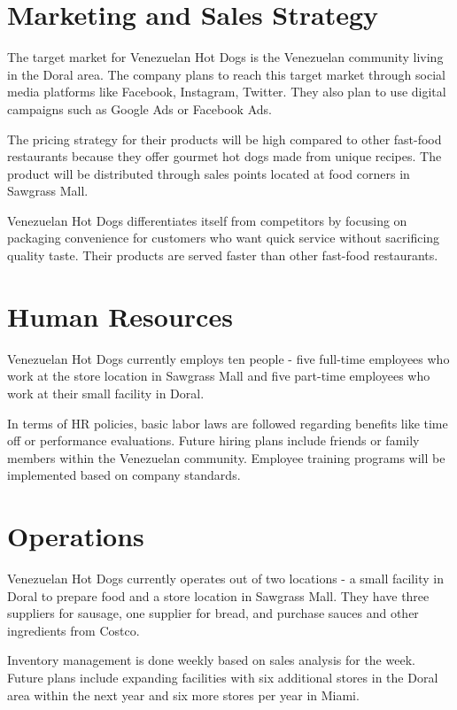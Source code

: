 \section{Marketing and Sales Strategy}\label{sec:marketing}

The target market for Venezuelan Hot Dogs is the Venezuelan community living in the Doral area. The company plans to reach this target market through social media platforms like Facebook, Instagram, Twitter. They also plan to use digital campaigns such as Google Ads or Facebook Ads.

The pricing strategy for their products will be high compared to other fast-food restaurants because they offer gourmet hot dogs made from unique recipes. The product will be distributed through sales points located at food corners in Sawgrass Mall.

Venezuelan Hot Dogs differentiates itself from competitors by focusing on packaging convenience for customers who want quick service without sacrificing quality taste. Their products are served faster than other fast-food restaurants.

\section{Human Resources}\label{sec:hr}

Venezuelan Hot Dogs currently employs ten people - five full-time employees who work at the store location in Sawgrass Mall and five part-time employees who work at their small facility in Doral.
 
In terms of HR policies, basic labor laws are followed regarding benefits like time off or performance evaluations. Future hiring plans include friends or family members within the Venezuelan community. Employee training programs will be implemented based on company standards.

\section{Operations}\label{sec:operations}

Venezuelan Hot Dogs currently operates out of two locations - a small facility in Doral to prepare food and a store location in Sawgrass Mall. They have three suppliers for sausage, one supplier for bread, and purchase sauces and other ingredients from Costco.

Inventory management is done weekly based on sales analysis for the week. Future plans include expanding facilities with six additional stores in the Doral area within the next year and six more stores per year in Miami.